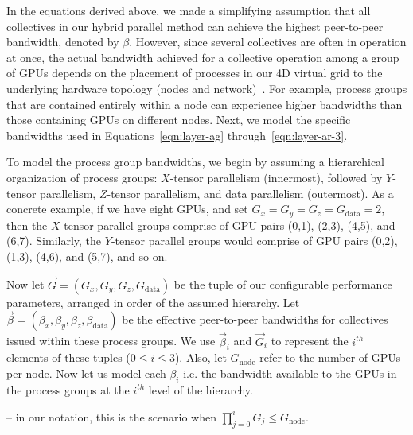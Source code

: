 In the equations derived above, we made a simplifying assumption that all
collectives in our hybrid parallel method can achieve the highest peer-to-peer
bandwidth, denoted by ${\beta}$. However, since several collectives are often
in operation at once, the actual bandwidth achieved for a collective operation
among a group of GPUs depends on the placement of processes in our 4D virtual
grid to the underlying hardware topology (nodes and network)~\cite{solomonik:sc2011, bhatele:sc2012b, abdel-gawad:sc2014, bhatele:hipc2014}. For example,
process groups that are contained entirely within a node can experience higher
bandwidths than those containing GPUs on different nodes. Next, we
model the specific bandwidths used in Equations~\ref{eqn:layer-ag}
through~\ref{eqn:layer-ar-3}.

To model the process group bandwidths, we begin by assuming a hierarchical organization of process groups: 
$X$-tensor parallelism (innermost), followed by $Y$-tensor parallelism, $Z$-tensor parallelism, and
data parallelism (outermost). As a concrete example, if we have eight GPUs, and set $G_{x}=G_{y}=G_{z}=G_{\mathrm{data}}=2$, 
then the $X$-tensor parallel groups comprise of GPU pairs 
(0,1), (2,3), (4,5), and (6,7). Similarly, the $Y$-tensor parallel groups would comprise of GPU pairs (0,2),
(1,3), (4,6), and (5,7), and so on.

Now let $\vec{G} = (G_{x}, G_{y}, G_{z}, G_{\mathrm{data}})$ be the tuple of our configurable performance 
parameters, arranged in order of the assumed hierarchy. Let 
$\vec{\beta} = (\beta_{x}, \beta_{y}, \beta_{z}, \beta_{\mathrm{data}})$ be the effective peer-to-peer bandwidths 
for collectives issued within these process groups. We use $\vec{\beta}_{i}$ and $\vec{G}_{i}$ to represent the $i^{\mathit{th}}$
elements of these tuples ($0 \leq i \leq 3$). Also, let $G_{\mathrm{node}}$ refer to the number of GPUs per node. Now let us 
model each $\beta_{i}$ i.e. the bandwidth available to the GPUs in the process groups at the $i^{\mathit{th}}$ level of the 
hierarchy.

\vspace{0.08in}
 --
in our notation, this is the scenario when $\prod_{j=0}^{i}G_{j} \leq G_{\mathrm{node}}$. 

